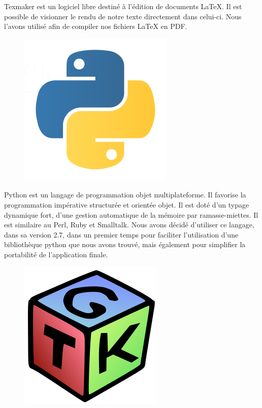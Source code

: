 \documentclass[17pts]{report}
\begin{document}
Texmaker est un logiciel libre destiné à l'édition de documents LaTeX.
Il est possible de visionner le rendu de notre texte directement dans celui-ci.
Nous l'avons utilisé afin de compiler nos fichiers LaTeX en PDF.\\

\begin{figure}[H]
    \includegraphics[scale=0.2]{illustrations/python.png}
    \centering
\end{figure}

Python est un langage de programmation objet multiplateforme.  Il favorise la
programmation impérative structurée et orientée objet. Il est doté d'un typage
dynamique fort, d'une gestion automatique de la mémoire par ramasse-miettes. Il
est similaire au Perl, Ruby et Smalltalk.  Nous avons décidé d'utiliser ce
langage, dans sa version 2.7, dans un premier temps pour faciliter
l'utilisation d'une bibliothèque python que nous avons trouvé, mais également
pour simplifier la portabilité de l'application finale.\\

\begin{figure}[H]
    \includegraphics[scale=0.2]{illustrations/gtk.png}
    \centering
\end{figure}
\end{document}
